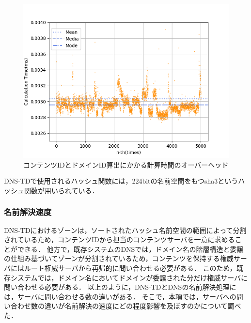 \begin{figure}[h]
 \centering
 \includegraphics[scale=0.8]{figure/overhead.png}
 \caption{コンテンツIDとドメインID算出にかかる計算時間のオーバーヘッド}
 \label{fig:overhead}
\end{figure}

DNS-TDで使用されるハッシュ関数には，224bitの名前空間をもつsha3というハッシュ関数が用いられている．
\newpage
\subsubsection{名前解決速度}
\label{sec:resolution_speed}
DNS-TDにおけるゾーンは，ソートされたハッシュ名前空間の範囲によって分割されているため，コンテンツIDから担当のコンテンツサーバを一意に求めることができる．
他方で，既存システムのDNSでは，ドメイン名の階層構造と委譲の仕組み基づいてゾーンが分割されているため，コンテンツを保持する権威サーバにはルート権威サーバから再帰的に問い合わせる必要がある．
このため，既存システムでは，ドメイン名においてドメインが委譲された分だけ権威サーバに問い合わせる必要がある．
以上のように，DNS-TDとDNSの名前解決処理には，サーバに問い合わせる数の違いがある．
そこで，本項では，サーバへの問い合わせ数の違いが名前解決の速度にどの程度影響を及ぼすのかについて調べた．

